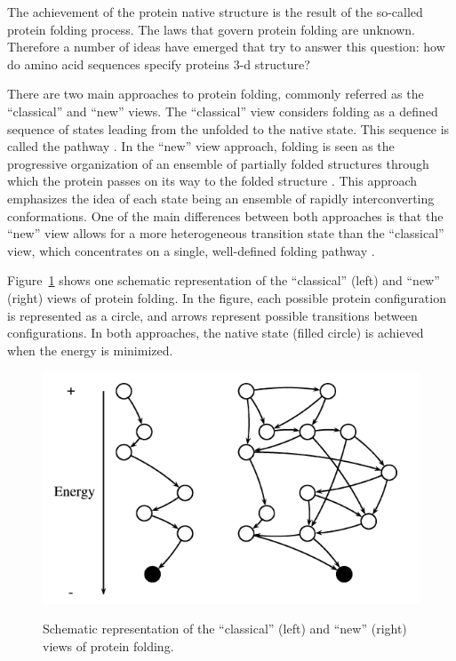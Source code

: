 The achievement of the protein native structure is the result of the so-called protein folding process. The laws that govern protein folding are unknown. Therefore a number of ideas have emerged that try to answer this question: how do amino acid sequences specify proteins 3-d structure?


There are two main approaches to protein folding, commonly referred as the ``classical'' and ``new'' views. The ``classical'' view considers folding as a defined sequence of states leading from the unfolded to the native state.  This sequence is called the pathway \cite{pande:1998}. In the  ``new'' view approach,   folding is seen as the progressive organization of an ensemble of partially folded structures  through which the protein passes on its way to the folded structure \cite{onuchic:2004}. This approach emphasizes the idea of each state being an ensemble of rapidly interconverting conformations. One of the main differences between both approaches is that the ``new'' view allows for a more heterogeneous transition state than the ``classical'' view, which concentrates on a single, well-defined folding pathway \cite{baker:2000}.


Figure~\ref{fig:protviews}  shows one schematic representation of the ``classical'' (left) and  ``new'' (right) views of protein folding. In the figure, each possible protein configuration is represented as a circle, and arrows represent possible transitions between configurations. In both approaches, the native state (filled circle) is achieved when the energy is minimized.


\begin{figure}[htb!]
	\includegraphics[scale=.6]{figures/protviews.png}
	\label{fig:protviews}
	\caption{Schematic representation of the “classical” (left) and “new” (right)
		views of protein folding.}
\end{figure}


